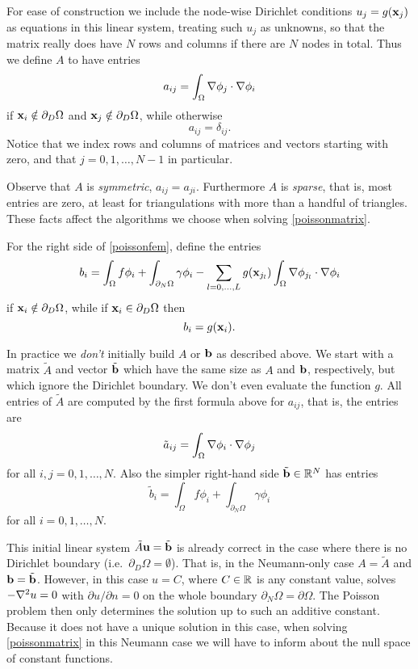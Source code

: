 For ease of construction we include the node-wise Dirichlet conditions $u_j=g(\mathbf{x}_j)$ as equations in this linear system, treating such $u_j$ as unknowns, so that the matrix really does have $N$ rows and columns if there are $N$ nodes in total.  Thus we define $A$ to have entries
\begin{equation}
a_{ij} = \int_\Omega \nabla \phi_j \cdot \nabla \phi_i \label{Aentryfem}
\end{equation}
if $\mathbf{x}_i \notin \partial_D \Omega$ and $\mathbf{x}_j \notin \partial_D \Omega$, while otherwise
\begin{equation*}
a_{ij} = \delta_{ij}.
\end{equation*}
Notice that we index rows and columns of matrices and vectors starting with zero, and that $j=0,1,\dots,N-1$ in particular.

Observe that $A$ is \emph{symmetric}, $a_{ij}=a_{ji}$.  Furthermore $A$ is \emph{sparse}, that is, most entries are zero, at least for triangulations with more than a handful of triangles.  These facts affect the algorithms we choose when solving \eqref{poissonmatrix}.

For the right side of \eqref{poissonfem}, define the entries
\begin{equation}
    b_i = \int_\Omega f \phi_i + \int_{\partial_N\Omega} \gamma \phi_i - \sum_{l=0,\dots,L} g(\mathbf{x}_{j_l})  \int_\Omega \nabla \phi_{j_l} \cdot \nabla \phi_i  \label{bentryfem}
\end{equation}
if $\mathbf{x}_i \notin \partial_D \Omega$, while if $\mathbf{x}_i \in \partial_D \Omega$ then
    $$b_i = g(\mathbf{x}_{i}).$$

In practice we \emph{don't} initially build $A$ or $\mathbf{b}$ as described above.  We start with a matrix $\tilde A$ and vector $\tilde {\mathbf{b}}$ which have the same size as $A$ and $\mathbf{b}$, respectively, but which ignore the Dirichlet boundary.  We don't even evaluate the function $g$.  All entries of $\tilde A$ are computed by the first formula above for $a_{ij}$, that is, the entries are
\begin{equation*}
\tilde a_{ij} = \int_\Omega \nabla \phi_i \cdot \nabla \phi_j
\end{equation*}
for all $i,j=0,1,\dots,N$.  Also the simpler right-hand side $\tilde {\mathbf{b}}\in\mathbb{R}^N$ has entries
    $$\tilde b_i = \int_\Omega f \phi_i + \int_{\partial_N\Omega} \gamma \phi_i$$
for all $i=0,1,\dots,N$.

This initial linear system $\tilde A\mathbf{u}=\tilde {\mathbf{b}}$ is already correct in the case where there is no Dirichlet boundary (i.e.~$\partial_D \Omega=\emptyset$).  That is, in the Neumann-only case $A=\tilde A$ and $\mathbf{b} = \tilde {\mathbf{b}}$.  However, in this case $u=C$, where $C\in\mathbb{R}$ is any constant value, solves $-\nabla^2 u=0$ with $\partial u/\partial n = 0$ on the whole boundary $\partial_N \Omega = \partial \Omega$.  The Poisson problem then only determines the solution up to such an additive constant.  Because it does not have a unique solution in this case, when solving \eqref{poissonmatrix} in this Neumann case we will have to inform \PETSc about the null space of constant functions.

